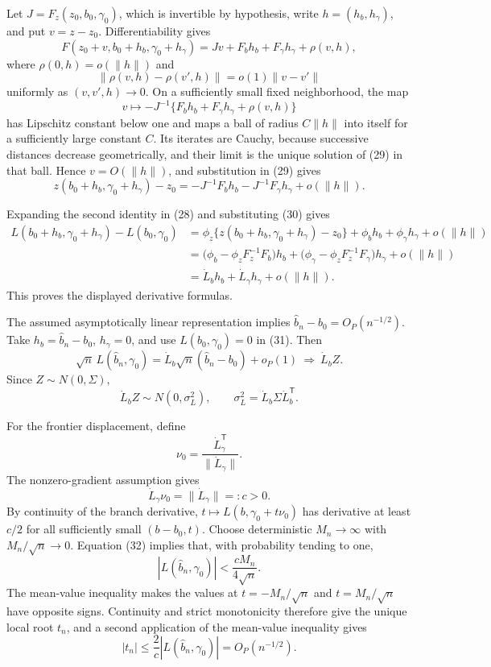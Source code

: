 Let \(J=F_z(z_0,b_0,\gamma_0)\), which is invertible by hypothesis, write \(h=(h_b,h_\gamma)\), and put \(v=z-z_0\).  Differentiability gives
\[
 F(z_0+v,b_0+h_b,\gamma_0+h_\gamma)
 =Jv+F_bh_b+F_\gamma h_\gamma+\rho(v,h),                               \tag{29}
\]
where \(\rho(0,h)=o(\|h\|)\) and
\[
 \|\rho(v,h)-\rho(v',h)\|=o(1)\|v-v'\|
\]
uniformly as \((v,v',h)\to0\).  On a sufficiently small fixed neighborhood, the map
\[
 v\longmapsto-J^{-1}\{F_bh_b+F_\gamma h_\gamma+\rho(v,h)\}
\]
has Lipschitz constant below one and maps a ball of radius \(C\|h\|\) into itself for a sufficiently large constant \(C\).  Its iterates are Cauchy, because successive distances decrease geometrically, and their limit is the unique solution of (29) in that ball.  Hence \(v=O(\|h\|)\), and substitution in (29) gives
\[
 z(b_0+h_b,\gamma_0+h_\gamma)-z_0
 =-J^{-1}F_bh_b-J^{-1}F_\gamma h_\gamma+o(\|h\|).                      \tag{30}
\]

Expanding the second identity in (28) and substituting (30) gives
\[
\begin{aligned}
 L(b_0+h_b,\gamma_0+h_\gamma)-L(b_0,\gamma_0)
 &=\phi_z\{z(b_0+h_b,\gamma_0+h_\gamma)-z_0\}
   +\phi_bh_b+\phi_\gamma h_\gamma+o(\|h\|)\\
 &=\bigl(\phi_b-\phi_zF_z^{-1}F_b\bigr)h_b
   +\bigl(\phi_\gamma-\phi_zF_z^{-1}F_\gamma\bigr)h_\gamma
   +o(\|h\|)\\
 &=\dot L_bh_b+\dot L_\gamma h_\gamma+o(\|h\|).
\end{aligned}                                                           \tag{31}
\]
This proves the displayed derivative formulas.

The assumed asymptotically linear representation implies \(\widehat b_n-b_0=O_P(n^{-1/2})\).  Take \(h_b=\widehat b_n-b_0\), \(h_\gamma=0\), and use \(L(b_0,\gamma_0)=0\) in (31).  Then
\[
 \sqrt n\,L(\widehat b_n,\gamma_0)
 =\dot L_b\sqrt n(\widehat b_n-b_0)+o_P(1)
 \ \Longrightarrow\ \dot L_bZ.                                      \tag{32}
\]
Since \(Z\sim N(0,\Sigma)\),
\[
 \dot L_bZ\sim N(0,\sigma_L^2),
 \qquad \sigma_L^2=\dot L_b\Sigma\dot L_b^{\mathsf T}.               \tag{33}
\]

For the frontier displacement, define
\[
 \nu_0=\frac{\dot L_\gamma^{\mathsf T}}{\|\dot L_\gamma\|}.
\]
The nonzero-gradient assumption gives
\[
 \dot L_\gamma\nu_0=\|\dot L_\gamma\|=:c>0.                         \tag{34}
\]
By continuity of the branch derivative, \(t\mapsto L(b,\gamma_0+t\nu_0)\) has derivative at least \(c/2\) for all sufficiently small \((b-b_0,t)\).  Choose deterministic \(M_n\to\infty\) with \(M_n/\sqrt n\to0\).  Equation (32) implies that, with probability tending to one,
\[
 |L(\widehat b_n,\gamma_0)|<\frac{cM_n}{4\sqrt n}.
\]
The mean-value inequality makes the values at \(t=-M_n/\sqrt n\) and \(t=M_n/\sqrt n\) have opposite signs.  Continuity and strict monotonicity therefore give the unique local root \(t_n\), and a second application of the mean-value inequality gives
\[
 |t_n|\leq\frac{2}{c}|L(\widehat b_n,\gamma_0)|=O_P(n^{-1/2}).          \tag{35}
\]

